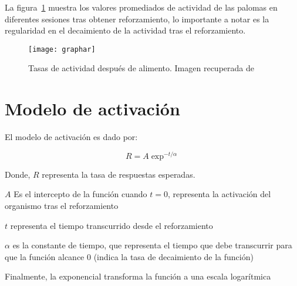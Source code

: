 \documentclass[12pt, letterpaper]{article}
\begin{document}
	La figura~\ref{fig:grapharousal} muestra los valores promediados de actividad de las palomas en diferentes sesiones tras obtener reforzamiento, lo importante a notar es la regularidad en el decaimiento de la actividad tras el reforzamiento.

\begin{figure}
	\centering
	\texttt{[image: graphar]}
	\caption{
	Tasas de actividad después de alimento.
	Imagen recuperada de \cite{killeen}}
	\label{fig:grapharousal}


\end{figure}

\clearpage

\section*{Modelo de activación}



El modelo de activación es dado por:

\begin{equation}
R = A\exp^{-t/\alpha}
\end{equation}

	\noindent Donde, $R$ representa la tasa de respuestas esperadas.
	
	\noindent $A$ Es el intercepto de la función cuando $t = 0$, representa la activación del organismo tras el reforzamiento

	\noindent $t$ representa el tiempo transcurrido desde el reforzamiento
	
	\noindent $\alpha$ es la constante de tiempo, que representa el tiempo que debe transcurrir para que la función alcance 0 (indica la tasa de decaimiento de la función)
	
	\noindent Finalmente, la exponencial transforma la función a una escala logarítmica





\end{document}
